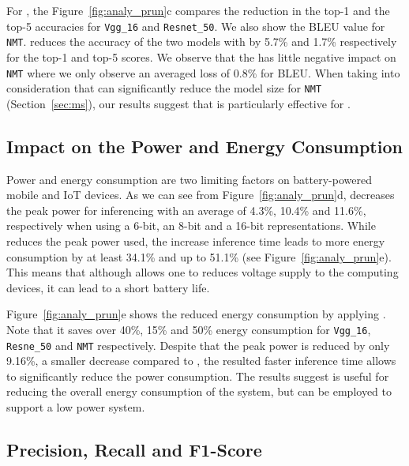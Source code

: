 For \pruning, the Figure~\ref{fig:analy_prun}c compares the reduction in the top-1 and the top-5 accuracies for \texttt{Vgg\_16} and
\texttt{Resnet\_50}. We also show the BLEU value for \texttt{NMT}. \pruning reduces the accuracy of the two \CNN models with by 5.7\% and
1.7\% respectively for the top-1 and top-5 scores. We observe that the \pruning has little negative impact on \texttt{NMT} where we only
observe an averaged loss of 0.8\% for BLEU. When taking into consideration that \pruning can significantly reduce the model size for
\texttt{NMT} (Section~\ref{sec:ms}), our results suggest that \pruning is particularly effective for \RNNs.





\subsection{Impact on the Power and Energy Consumption}
Power and energy consumption are two limiting factors on battery-powered mobile and IoT devices. As we can see from
Figure~\ref{fig:analy_prun}d, \quantization decreases the peak power for inferencing with an average of 4.3\%, 10.4\% and 11.6\%,
respectively when using a 6-bit, an 8-bit and a 16-bit representations. While \quantization reduces the peak power used, the increase
inference time leads to more energy consumption by at least 34.1\% and up to 51.1\% (see Figure~\ref{fig:analy_prun}e). This means that
although \quantization allows one to reduces voltage supply to the computing devices, it can lead to a short battery life.

Figure~\ref{fig:analy_prun}e shows the reduced energy consumption by applying \pruning. Note that it saves over 40\%, 15\% and 50\% energy
consumption for \texttt{Vgg\_16}, \texttt{Resne\_50} and \texttt{NMT} respectively. Despite that the peak power is reduced by only 9.16\%,
a smaller decrease compared to \quantization, the resulted faster inference time allows \pruning to significantly reduce the power
consumption. The results suggest \pruning is useful for reducing the overall energy consumption of the system, but \quantization can be
employed to support a low power system.



\subsection{Precision, Recall and F1-Score}


